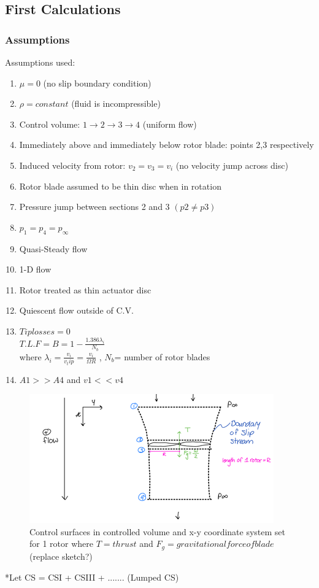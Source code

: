 
\subsection*{First Calculations}
\subsubsection*{Assumptions}
Assumptions used:

\begin{enumerate}[label=\roman*.]
\item$\mu = 0$ (no slip boundary condition)
\item$\rho =constant$ (fluid is incompressible)
\item Control volume: $1\rightarrow 2\rightarrow3\rightarrow 4$ (uniform flow)
\item Immediately above and immediately below rotor blade: points 2,3 respectively
\item Induced velocity from rotor: $v_2=v_3=v_i$ (no velocity jump across disc)
\item Rotor blade assumed to be thin disc when in rotation
\item Pressure jump between sections 2 and 3 $(p2 \neq p3)$
\item $p_1=p_4=p_\infty$
\item Quasi-Steady flow
\item 1-D flow
\item Rotor treated as thin actuator disc
\item Quiescent flow outside of C.V.
\item $ Tip losses=0$   \\ 
 $\displaystyle{T.L.F=B=1-\frac{1.386\lambda_i}{N_b}}$   \\
 where $\displaystyle{\lambda_i=\frac{v_i}{v_tip}=\frac{v_i}{\Omega R}}$ , $N_b$= number of rotor blades
\item $A1>>A4$ and $v1<<v4$
\end{enumerate}

\begin{figure}[h!]
\begin{center}
  \includegraphics[scale=1]{Pictures/part1_fig1.png}
  \caption{Control surfaces in controlled volume and x-y coordinate system set for 1 rotor where $T = thrust$ and $F_g= gravitational force of blade$ (replace sketch?)}
    \label{fig:romi_part1_fig1}
\end{center}
\end{figure}
\FloatBarrier
*Let CS = CSI + CSIII + ....... (Lumped CS)

